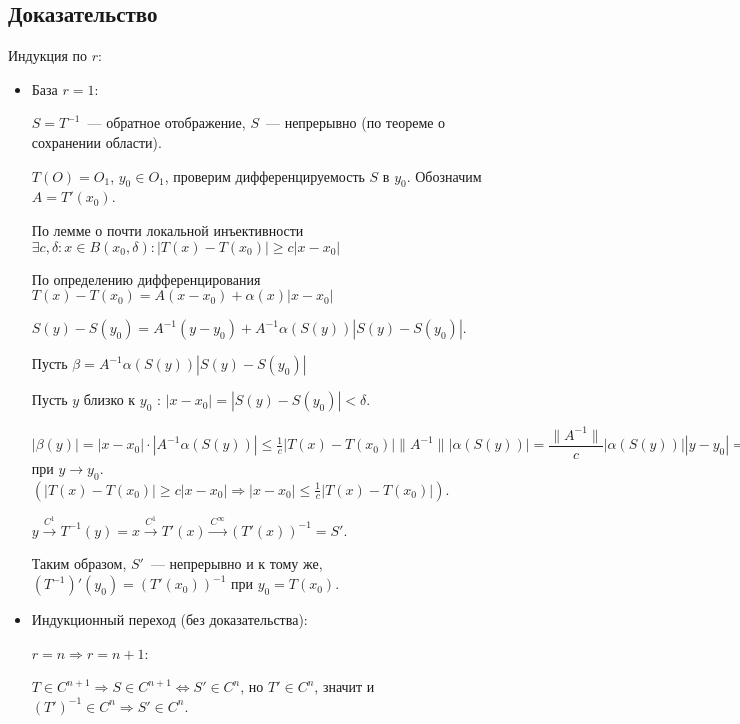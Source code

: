 \documentclass{article}
\begin{document}
        \subsection{Доказательство}
        
            Индукция по $r$:
            
            \begin{itemize}
            
                \item База $r = 1$:
                
                    $S = T^{-1}$~--- обратное отображение, $S$~--- непрерывно (по теореме о сохранении области).
                    
                    $T(O) = O_1$, $y_0 \in O_1$, проверим дифференцируемость $S$ в $y_0$. Обозначим $A = T'(x_0)$.
                    
                    По лемме о почти локальной инъективности $\exists c, \delta : x \in B(x_0, \delta) : \left| T(x) - T(x_0) \right| \geqslant c | x - x_0 |$
                    
                    По определению дифференцирования $T(x) - T(x_0) = A(x - x_0) + \alpha(x) | x - x_0 |$
                    
                    $S(y) - S(y_0) = A^{-1} (y - y_0) + A^{-1} \alpha \left( S(y) \right) \left| S(y) - S(y_0) \right|$.
                    
                    Пусть $\beta = A^{-1} \alpha \left( S(y) \right) \left| S(y) - S(y_0) \right|$
                    
                    Пусть $y$ близко к $y_0$ : $| x - x_0 | = \left| S(y) - S(y_0) \right| < \delta$.
                    
                    $| \beta(y) | = |x - x_0| \cdot \left| A^{-1} \alpha \left( S(y) \right) \right| \leqslant \frac{1}{c} \left| T(x) - T(x_0) \right| \| A^{-1} \|  | \alpha \left( S(y) \right) | = \dfrac{\| A^{-1} \|}{c} \left| \alpha \left( S(y) \right) \right| |y - y_0| = o(|y - y_0|)$ при $y \rightarrow y_0$. $\left( \left| T(x) - T(x_0) \right| \geqslant c | x - x_0 | \Rightarrow | x - x_0 | \leqslant \frac{1}{c} \left| T(x) - T(x_0) \right| \right)$.
                
                    $y \xrightarrow{C^1} T^{-1} (y) = x \xrightarrow{C^1} T'(x) \xrightarrow{C^{\infty}} \left(T'(x)\right)^{-1} = S'$.
                    
                    Таким образом, $S'$~--- непрерывно и к тому же, $\left( T^{-1} \right)'(y_0) = \left( T'(x_0) \right)^{-1}$ при $y_0 = T(x_0)$.
                
                \item Индукционный переход (без доказательства):
                
                    $r = n \Rightarrow r = n + 1$:
                    
                    $T \in C^{n + 1} \Rightarrow S \in C^{n + 1} \Longleftrightarrow S' \in C^n$, но $T' \in C^n$, значит и $\left( T' \right)^{-1} \in C^n \Rightarrow S' \in C^n$.
                    
            \end{itemize}
            
\end{document}
